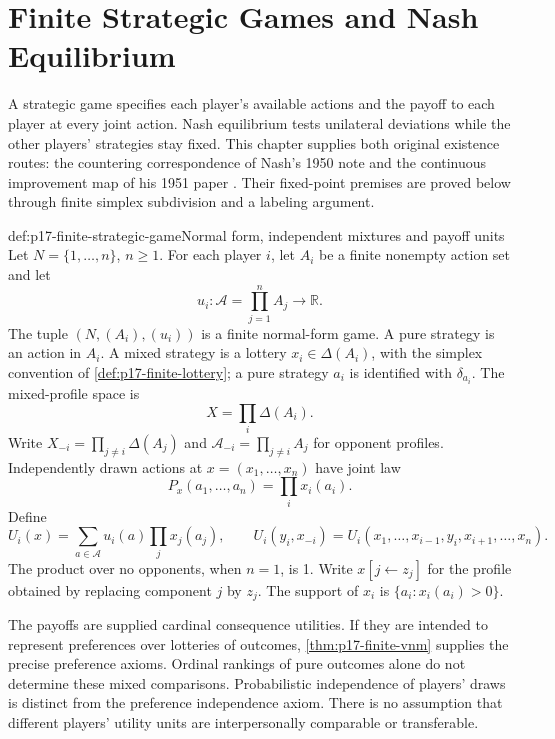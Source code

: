 \chapter{Finite Strategic Games and Nash Equilibrium}
\label{sec:p17-finite-strategic-games}

A strategic game specifies each player's available actions and the
payoff to each player at every joint action. Nash equilibrium tests
unilateral deviations while the other players' strategies stay fixed.
This chapter supplies both original existence routes: the countering
correspondence of Nash's 1950 note and the continuous improvement map
of his 1951 paper \cite{Nash1950EquilibriumPoints,Nash1951NonCooperative}.
Their fixed-point premises are proved below through finite simplex
subdivision and a labeling argument.

\begin{hbdefinition}{def:p17-finite-strategic-game}{Normal form, independent mixtures and payoff units}
Let \(N=\{1,\ldots,n\}\), \(n\geq1\). For each player \(i\), let
\(A_i\) be a finite nonempty action set and let
\[
                 u_i:\mathcal A=\prod_{j=1}^n A_j\longrightarrow\mathbb R.
\]
The tuple \((N,(A_i),(u_i))\) is a finite normal-form game.
A pure strategy is an action in \(A_i\). A mixed strategy is a
lottery \(x_i\in\Delta(A_i)\), with the simplex convention of
\cref{def:p17-finite-lottery}; a pure strategy \(a_i\) is identified
with \(\delta_{a_i}\). The mixed-profile space is
\[
                     X=\prod_i\Delta(A_i).
\]
Write \(X_{-i}=\prod_{j\ne i}\Delta(A_j)\) and
\(\mathcal A_{-i}=\prod_{j\ne i}A_j\) for opponent profiles.
Independently drawn actions at \(x=(x_1,\ldots,x_n)\) have joint law
\[
                P_x(a_1,\ldots,a_n)=\prod_i x_i(a_i).
\]
Define
\[
 U_i(x)=\sum_{a\in\mathcal A}u_i(a)\prod_jx_j(a_j),\qquad
 U_i(y_i,x_{-i})=U_i(x_1,\ldots,x_{i-1},y_i,x_{i+1},\ldots,x_n).
\]
The product over no opponents, when \(n=1\), is 1.
Write \(x[j\leftarrow z_j]\) for the profile obtained by replacing
component \(j\) by \(z_j\). The support of \(x_i\) is
\(\{a_i:x_i(a_i)>0\}\).

The payoffs are supplied cardinal consequence utilities.
If they are intended to represent preferences over lotteries of
outcomes, \cref{thm:p17-finite-vnm} supplies the precise preference
axioms. Ordinal rankings of pure outcomes alone do not determine
these mixed comparisons. Probabilistic independence of players'
draws is distinct from the preference independence axiom.
There is no assumption that different players' utility units are
interpersonally comparable or transferable.
\end{hbdefinition}

